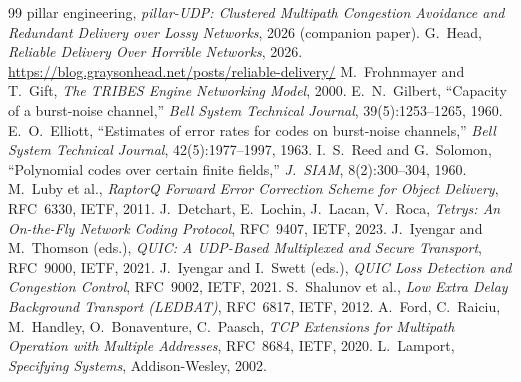 \documentclass[10pt,twocolumn]{article}
\begin{document}
\begin{thebibliography}{99}
\small
{} pillar engineering, \emph{pillar-UDP: Clustered Multipath
Congestion Avoidance and Redundant Delivery over Lossy Networks}, 2026
(companion paper).
 G.~Head, \emph{Reliable Delivery Over Horrible Networks}, 2026.
\url{https://blog.graysonhead.net/posts/reliable-delivery/}
 M.~Frohnmayer and T.~Gift, \emph{The TRIBES Engine Networking
Model}, 2000.
 E.~N.~Gilbert, ``Capacity of a burst-noise channel,''
\emph{Bell System Technical Journal}, 39(5):1253--1265, 1960.
 E.~O.~Elliott, ``Estimates of error rates for codes on
burst-noise channels,'' \emph{Bell System Technical Journal},
42(5):1977--1997, 1963.
 I.~S.~Reed and G.~Solomon, ``Polynomial codes over certain
finite fields,'' \emph{J.\ SIAM}, 8(2):300--304, 1960.
 M.~Luby et al., \emph{RaptorQ Forward Error Correction Scheme
for Object Delivery}, RFC~6330, IETF, 2011.
 J.~Detchart, E.~Lochin, J.~Lacan, V.~Roca, \emph{Tetrys: An
On-the-Fly Network Coding Protocol}, RFC~9407, IETF, 2023.
 J.~Iyengar and M.~Thomson (eds.), \emph{QUIC: A UDP-Based
Multiplexed and Secure Transport}, RFC~9000, IETF, 2021.
 J.~Iyengar and I.~Swett (eds.), \emph{QUIC Loss Detection
and Congestion Control}, RFC~9002, IETF, 2021.
 S.~Shalunov et al., \emph{Low Extra Delay Background Transport
(LEDBAT)}, RFC~6817, IETF, 2012.
 A.~Ford, C.~Raiciu, M.~Handley, O.~Bonaventure, C.~Paasch,
\emph{TCP Extensions for Multipath Operation with Multiple Addresses}, RFC~8684,
IETF, 2020.
 L.~Lamport, \emph{Specifying Systems}, Addison-Wesley, 2002.
\end{thebibliography}
\end{document}

